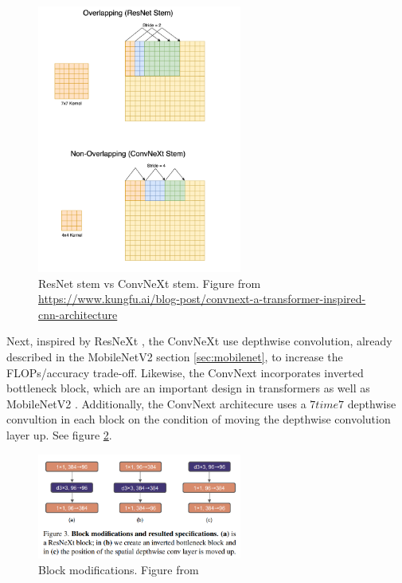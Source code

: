 \begin{figure}[h!]
    \centering
    \includegraphics[width=0.6\textwidth]{Images/stem.png} 
    \caption{ResNet stem vs ConvNeXt stem. Figure from \url{https://www.kungfu.ai/blog-post/convnext-a-transformer-inspired-cnn-architecture} }
    \label{fig:stem}
\end{figure}

Next, inspired by ResNeXt \cite{xie2017aggregatedresidualtransformationsdeep}, the ConvNeXt use depthwise convolution, already described in the MobileNetV2 section \ref{sec:mobilenet}, to increase the FLOPs/accuracy trade-off. Likewise, the ConvNext incorporates inverted bottleneck block, which are an important design in transformers as well as MobileNetV2 \cite{liu2022convnet2020s}. Additionally, the ConvNext architecure uses a $7 time 7$ depthwise convultion in each block on the condition of moving the depthwise convolution layer up. See figure \ref{fig:conv_block}.

\begin{figure}[h!]
    \centering
    \includegraphics[width=0.6\textwidth]{Images/convnext_block_mod.png} 
    \caption{Block modifications. Figure from \cite{liu2022convnet2020s} }
    \label{fig:conv_block}
\end{figure}


